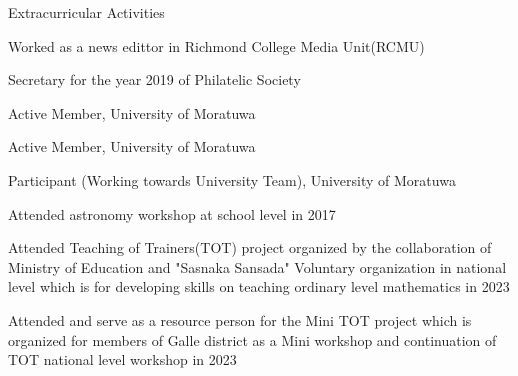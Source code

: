 \begin{rubric}{Extracurricular Activities}


\entry*[Societies]
    \par Worked as a news edittor in Richmond College Media Unit(RCMU)
    \par Secretary for the year 2019 of Philatelic Society 

    Active Member, University of Moratuwa

    Active Member, University of Moratuwa

    Participant (Working towards University Team), University of Moratuwa

    Attended astronomy workshop at school level in 2017
    
    Attended Teaching of Trainers(TOT) project organized by the collaboration of Ministry of Education and "Sasnaka Sansada" Voluntary organization in national level which is for developing skills on teaching ordinary level mathematics in 2023

    Attended and serve as a resource person for the Mini TOT project which is organized for members of Galle district as a Mini workshop and continuation of TOT national level workshop in 2023



\end{rubric}